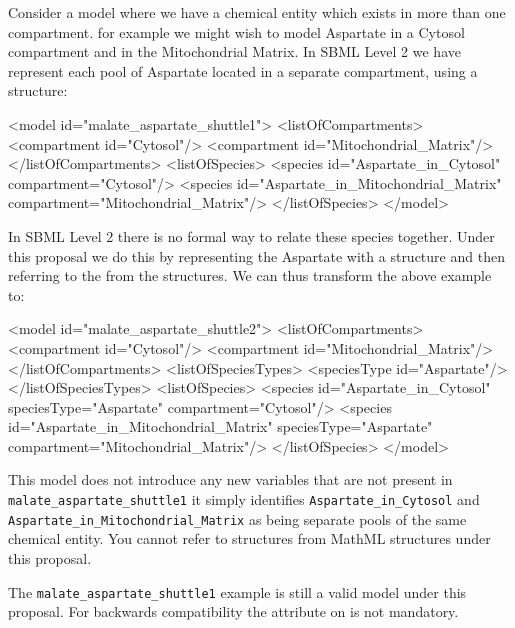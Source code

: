 \documentclass{cekarticle}
\begin{document}
Consider a model where we have a chemical entity which exists in more than one compartment.
for example we might wish to model Aspartate in a Cytosol compartment and in the Mitochondrial Matrix.
In SBML Level 2 we have represent each pool of Aspartate located in a separate compartment, using a
 structure:

\begin{example}
<model id="malate_aspartate_shuttle1">
    <listOfCompartments>
        <compartment id="Cytosol"/>
        <compartment id="Mitochondrial_Matrix"/>
    </listOfCompartments>
    <listOfSpecies>
        <species id="Aspartate_in_Cytosol" compartment="Cytosol"/>
        <species id="Aspartate_in_Mitochondrial_Matrix" compartment="Mitochondrial_Matrix"/>
    </listOfSpecies>
</model>
\end{example}

In SBML Level 2 there is no formal way to relate these species together.  Under this proposal
we do this by representing the Aspartate with a  structure and then
referring to the  from the  structures.  We can thus transform the 
above example to:

\begin{example}
<model id="malate_aspartate_shuttle2">
    <listOfCompartments>
        <compartment id="Cytosol"/>
        <compartment id="Mitochondrial_Matrix"/>
    </listOfCompartments>
    <listOfSpeciesTypes>
        <speciesType id="Aspartate"/>
    </listOfSpeciesTypes>
    <listOfSpecies>
        <species
            id="Aspartate_in_Cytosol"
            speciesType="Aspartate"
            compartment="Cytosol"/>
        <species
            id="Aspartate_in_Mitochondrial_Matrix"
            speciesType="Aspartate"
            compartment="Mitochondrial_Matrix"/>
    </listOfSpecies>
</model>
\end{example}

This model does not introduce any new variables that are not present in
\texttt{malate\_aspartate\_shuttle1} it simply identifies \texttt{Aspartate\_in\_Cytosol}
and \texttt{Aspartate\_in\_Mitochondrial\_Matrix} as being separate pools of the same chemical entity.
You cannot refer to  structures from MathML structures under this proposal.

The \texttt{malate\_aspartate\_shuttle1} example is still a valid model under this proposal.
For backwards compatibility the  attribute on  is not
mandatory.
\end{document}

